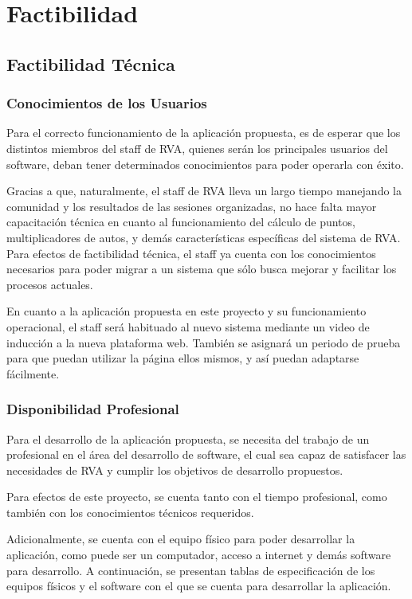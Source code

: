 \chapter{Factibilidad}

\section{Factibilidad Técnica}
\subsection{Conocimientos de los Usuarios}
Para el correcto funcionamiento de la aplicación propuesta, es de esperar que los distintos miembros del staff de RVA, quienes serán los principales usuarios del software, deban tener determinados conocimientos para poder operarla con éxito.

Gracias a que, naturalmente, el staff de RVA lleva un largo tiempo manejando la comunidad y los resultados de las sesiones organizadas, no hace falta mayor capacitación técnica en cuanto al funcionamiento del cálculo de puntos, multiplicadores de autos, y demás características específicas del sistema de RVA. Para efectos de factibilidad técnica, el staff ya cuenta con los conocimientos necesarios para poder migrar a un sistema que sólo busca mejorar y facilitar los procesos actuales.

En cuanto a la aplicación propuesta en este proyecto y su funcionamiento operacional, el staff será habituado al nuevo sistema mediante un video de inducción a la nueva plataforma web. También se asignará un periodo de prueba para que puedan utilizar la página ellos mismos, y así puedan adaptarse fácilmente.

\subsection{Disponibilidad Profesional}
Para el desarrollo de la aplicación propuesta, se necesita del trabajo de un profesional en el área del desarrollo de software, el cual sea capaz de satisfacer las necesidades de RVA y cumplir los objetivos de desarrollo propuestos.

Para efectos de este proyecto, se cuenta tanto con el tiempo profesional, como también con los conocimientos técnicos requeridos.

Adicionalmente, se cuenta con el equipo físico para poder desarrollar la aplicación, como puede ser un computador, acceso a internet y demás software para desarrollo. A continuación, se presentan tablas de especificación de los equipos físicos y el software con el que se cuenta para desarrollar la aplicación.

